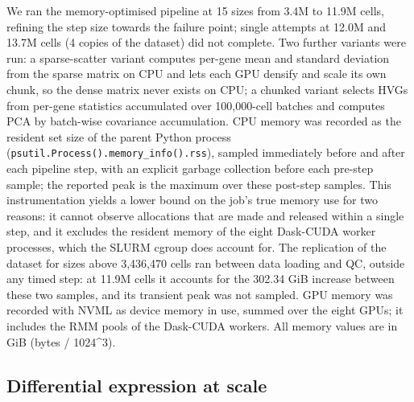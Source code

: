 \documentclass[runningheads]{llncs}
\begin{document}
We ran the memory-optimised pipeline at 15 sizes from 3.4M to 11.9M cells, refining the step size towards the failure point; single attempts at 12.0M and 13.7M cells (4 copies of the dataset) did not complete. Two further variants were run: a sparse-scatter variant computes per-gene mean and standard deviation from the sparse matrix on CPU and lets each GPU densify and scale its own chunk, so the dense matrix never exists on CPU; a chunked variant selects HVGs from per-gene statistics accumulated over 100,000-cell batches and computes PCA by batch-wise covariance accumulation. CPU memory was recorded as the resident set size of the parent Python process (\texttt{psutil.Process().memory\_\allowbreak{}info().rss}), sampled immediately before and after each pipeline step, with an explicit garbage collection before each pre-step sample; the reported peak is the maximum over these post-step samples. This instrumentation yields a lower bound on the job's true memory use for two reasons: it cannot observe allocations that are made and released within a single step, and it excludes the resident memory of the eight Dask-CUDA worker processes, which the SLURM cgroup does account for. The replication of the dataset for sizes above 3,436,470 cells ran between data loading and QC, outside any timed step: at 11.9M cells it accounts for the 302.34 GiB increase between these two samples, and its transient peak was not sampled. GPU memory was recorded with NVML as device memory in use, summed over the eight GPUs; it includes the RMM pools of the Dask-CUDA workers. All memory values are in GiB (bytes / 1024\^{}3).

\hypertarget{differential-expression-at-scale}{%
\subsection{Differential expression at scale}\label{differential-expression-at-scale}}
\end{document}
